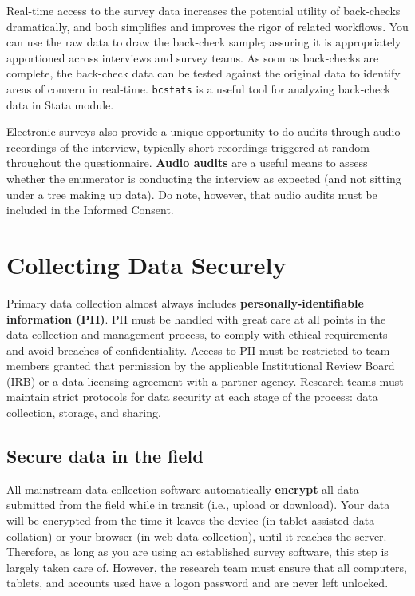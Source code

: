Real-time access to the survey data increases the potential utility of
back-checks dramatically, and both simplifies and improves the rigor of related
workflows.
You can use the raw data to draw the back-check sample; assuring it is
appropriately apportioned across interviews and survey teams.
As soon as back-checks are complete, the back-check data can be tested against
the original data to identify areas of concern in real-time.
\texttt{bcstats} is a useful tool for analyzing back-check data in Stata module.

Electronic surveys also provide a unique opportunity to do audits through audio recordings of the interview,
typically short recordings triggered at random throughout the questionnaire.
\textbf{Audio audits} are a useful means to assess whether the enumerator is conducting the interview
as expected (and not sitting under a tree making up data).
Do note, however, that audio audits must be included in the Informed Consent.


\section{Collecting Data Securely}
Primary data collection almost always includes \textbf{personally-identifiable information (PII)}.
PII must be handled with great care at all points in the data collection and management process, to comply with ethical requirements and avoid breaches of confidentiality. Access to PII must be restricted to team members granted that permission by the applicable Institutional Review Board (IRB) or a data licensing
agreement with a partner agency. Research teams must maintain strict protocols for data security at each stage of the process: data collection, storage, and sharing.

\subsection{Secure data in the field}
All mainstream data collection software automatically \textbf{encrypt}
all data submitted from the field while in transit (i.e., upload or download). Your
data will be encrypted from the time it leaves the device (in tablet-assisted data 
collation) or your browser (in web data collection), until it reaches the server. 
Therefore, as long as you are using an established survey software, this step is 
largely taken care of. 
However, the research team must ensure that all computers, tablets, and accounts
used have a logon password and are never left unlocked.

